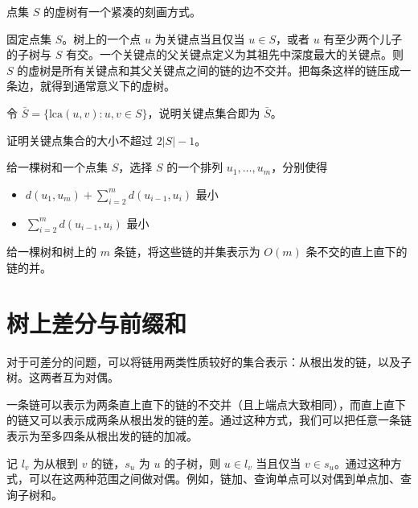 点集 $S$ 的虚树有一个紧凑的刻画方式。
\begin{property}
    固定点集 $S$。树上的一个点 $u$ 为关键点当且仅当 $u\in S$，或者 $u$ 有至少两个儿子的子树与 $S$ 有交。一个关键点的父关键点定义为其祖先中深度最大的关键点。则 $S$ 的虚树是所有关键点和其父关键点之间的链的边不交并。把每条这样的链压成一条边，就得到通常意义下的虚树。
\end{property}
\begin{exercise}
    令 $\bar S = \{\mathrm{lca}(u,v):u,v\in S\}$，说明关键点集合即为 $\bar S$。
\end{exercise}
\begin{exercise}
    证明关键点集合的大小不超过 $2|S|-1$。
\end{exercise}

\begin{example}[树上 TSP]
    给一棵树和一个点集 $S$，选择 $S$ 的一个排列 $u_1,\ldots,u_m$，分别使得
    \begin{itemize}
        \item $d(u_1,u_m)+\sum_{i=2}^m d(u_{i-1},u_i)$ 最小        
        \item $\sum_{i=2}^m d(u_{i-1},u_i)$ 最小
    \end{itemize}
\end{example}

\begin{example}[链并]
    给一棵树和树上的 $m$ 条链，将这些链的并集表示为 $O(m)$ 条不交的直上直下的链的并。
\end{example}

\section{树上差分与前缀和}

对于可差分的问题，可以将链用两类性质较好的集合表示：从根出发的链，以及子树。这两者互为对偶。

一条链可以表示为两条直上直下的链的不交并（且上端点大致相同），而直上直下的链又可以表示成两条从根出发的链的差。通过这种方式，我们可以把任意一条链表示为至多四条从根出发的链的加减。


记 $l_v$ 为从根到 $v$ 的链，$s_u$ 为 $u$ 的子树，则 $u\in l_v$ 当且仅当 $v\in s_u$。通过这种方式，可以在这两种范围之间做对偶。例如，链加、查询单点可以对偶到单点加、查询子树和。

